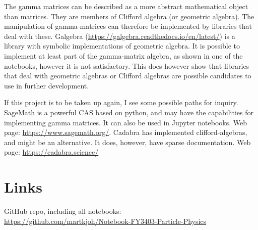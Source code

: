 \documentclass{article}
\begin{document}
    The gamma matrices can be described as a more abstract mathematical object than matrices. They are members of Clifford algebra (or geometric algebra). The manipulation of gamma-matrices can therefore be implemented by libraries that deal with these. Galgebra (\url{https://galgebra.readthedocs.io/en/latest/}) is a library with symbolic implementations of geometric algebra. It is possible to implement at least part of the gamma-matrix algebra, as shown in one of the notebooks, however it is not satisfactory. This does however show that libraries that deal with geometric algebras or Clifford algebras are possible candidates to use in further development. 

    If this project is to be taken up again, I see some possible paths for inquiry. SageMath is a powerful CAS based on python, and may have the capabilities for implementing gamma matrices. It can also be used in Jupyter notebooks. Web page: \url{https://www.sagemath.org/}. Cadabra has implemented clifford-algebras, and might be an alternative. It does, however, have sparse documentation. Web page: \url{https://cadabra.science/ }

    \section*{Links}
    GitHub repo, including all notebooks:\\
    \url{https://github.com/martkjoh/Notebook-FY3403-Particle-Physics}
\end{document}
